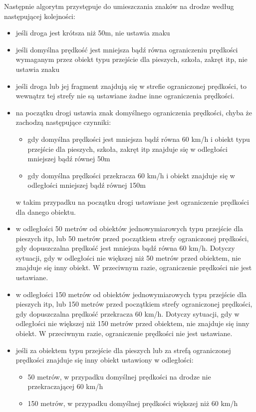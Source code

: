 Następnie algorytm przystępuje do umieszczania znaków na drodze według następującej kolejności:
\begin{itemize}
\item jeśli droga jest krótsza niż 50m, nie ustawia znaku
\item jeśli domyślna prędkość jest mniejsza bądź równa ograniczeniu prędkości wymaganym przez obiekt typu przejście dla pieszych, szkoła, zakręt itp, nie ustawia znaku
\item jeśli droga lub jej fragment znajdują się w strefie ograniczonej prędkości, to wewnątrz tej strefy nie są ustawiane żadne inne ograniczenia prędkości.
\item na początku drogi ustawia znak domyślnego ograniczenia prędkości, chyba że zachodzą następujące czynniki:
\begin{itemize}
\item gdy domyślna prędkości jest mniejsza bądź równa 60 km/h i obiekt typu przejście dla pieszych, szkoła, zakręt itp znajduje się w  odległości mniejszej bądź równej 50m
\item gdy domyślna prędkości przekracza 60 km/h i obiekt znajduje się w  odległości mniejszej bądź równej 150m 
\end{itemize}
w takim przypadku na początku drogi ustawiane jest ograniczenie prędkości dla danego obiektu.
\item w odległości 50 metrów od obiektów jednowymiarowych typu przejście dla pieszych itp, lub 50 metrów przed początkiem strefy ograniczonej prędkości, gdy dopuszczalna prędkość jest mniejsza bądź równa 60 km/h. Dotyczy sytuacji, gdy w odległości nie większej niż 50 metrów przed obiektem, nie znajduje się inny obiekt. W przeciwnym razie, ograniczenie prędkości nie jest ustawiane.
\item w odległości 150 metrów od obiektów jednowymiarowych typu przejście dla pieszych itp, lub 150 metrów przed początkiem strefy ograniczonej prędkości, gdy dopuszczalna prędkość przekracza 60 km/h. Dotyczy sytuacji, gdy w odległości nie większej niż 150 metrów przed obiektem, nie znajduje się inny obiekt. W przeciwnym razie, ograniczenie prędkości nie jest ustawiane.
\item jeśli za obiektem typu przejście dla pieszych lub za strefą ograniczonej prędkości znajduje się inny obiekt ustawiony w odległości:
\begin{itemize}
\item 50 metrów, w przypadku domyślnej prędkości na drodze nie przekraczającej 60 km/h
\item 150 metrów, w przypadku domyślnej prędkości większej niż 60 km/h

\end{itemize}
\end{itemize}
